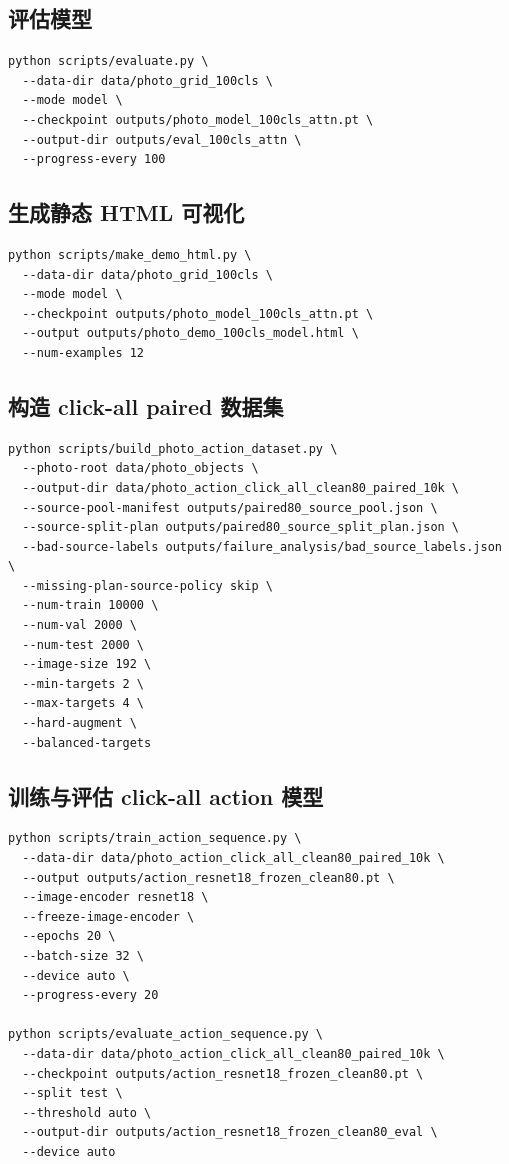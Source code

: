 \documentclass[UTF8,a4paper,12pt,fontset=fandol]{ctexart}
\begin{document}
\subsection{评估模型}
\begin{verbatim}
python scripts/evaluate.py \
  --data-dir data/photo_grid_100cls \
  --mode model \
  --checkpoint outputs/photo_model_100cls_attn.pt \
  --output-dir outputs/eval_100cls_attn \
  --progress-every 100
\end{verbatim}

\subsection{生成静态 HTML 可视化}
\begin{verbatim}
python scripts/make_demo_html.py \
  --data-dir data/photo_grid_100cls \
  --mode model \
  --checkpoint outputs/photo_model_100cls_attn.pt \
  --output outputs/photo_demo_100cls_model.html \
  --num-examples 12
\end{verbatim}

\subsection{构造 click-all paired 数据集}
\begin{verbatim}
python scripts/build_photo_action_dataset.py \
  --photo-root data/photo_objects \
  --output-dir data/photo_action_click_all_clean80_paired_10k \
  --source-pool-manifest outputs/paired80_source_pool.json \
  --source-split-plan outputs/paired80_source_split_plan.json \
  --bad-source-labels outputs/failure_analysis/bad_source_labels.json \
  --missing-plan-source-policy skip \
  --num-train 10000 \
  --num-val 2000 \
  --num-test 2000 \
  --image-size 192 \
  --min-targets 2 \
  --max-targets 4 \
  --hard-augment \
  --balanced-targets
\end{verbatim}

\subsection{训练与评估 click-all action 模型}
\begin{verbatim}
python scripts/train_action_sequence.py \
  --data-dir data/photo_action_click_all_clean80_paired_10k \
  --output outputs/action_resnet18_frozen_clean80.pt \
  --image-encoder resnet18 \
  --freeze-image-encoder \
  --epochs 20 \
  --batch-size 32 \
  --device auto \
  --progress-every 20

python scripts/evaluate_action_sequence.py \
  --data-dir data/photo_action_click_all_clean80_paired_10k \
  --checkpoint outputs/action_resnet18_frozen_clean80.pt \
  --split test \
  --threshold auto \
  --output-dir outputs/action_resnet18_frozen_clean80_eval \
  --device auto
\end{verbatim}
\end{document}
